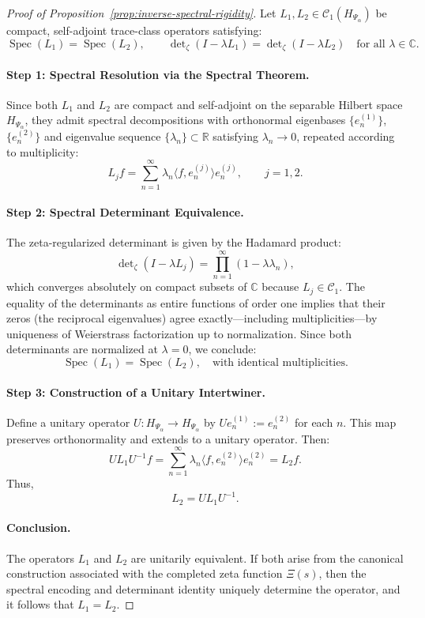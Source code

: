 \begin{proof}[Proof of Proposition~\ref{prop:inverse-spectral-rigidity}]
Let \( L_1, L_2 \in \mathcal{C}_1(H_{\Psi_\alpha}) \) be compact, self-adjoint trace-class operators satisfying:
\[
\operatorname{Spec}(L_1) = \operatorname{Spec}(L_2), \qquad
\det\nolimits_\zeta(I - \lambda L_1) = \det\nolimits_\zeta(I - \lambda L_2) \quad \text{for all } \lambda \in \mathbb{C}.
\]

\paragraph{Step 1: Spectral Resolution via the Spectral Theorem.}
Since both \( L_1 \) and \( L_2 \) are compact and self-adjoint on the separable Hilbert space \( H_{\Psi_\alpha} \), they admit spectral decompositions with orthonormal eigenbases \( \{e_n^{(1)}\} \), \( \{e_n^{(2)}\} \) and eigenvalue sequence \( \{\lambda_n\} \subset \mathbb{R} \) satisfying \( \lambda_n \to 0 \), repeated according to multiplicity:
\[
L_j f = \sum_{n=1}^\infty \lambda_n \langle f, e_n^{(j)} \rangle e_n^{(j)}, \qquad j = 1,2.
\]

\paragraph{Step 2: Spectral Determinant Equivalence.}
The zeta-regularized determinant is given by the Hadamard product:
\[
\det\nolimits_\zeta(I - \lambda L_j) = \prod_{n=1}^\infty (1 - \lambda \lambda_n),
\]
which converges absolutely on compact subsets of \( \mathbb{C} \) because \( L_j \in \mathcal{C}_1 \). The equality of the determinants as entire functions of order one implies that their zeros (the reciprocal eigenvalues) agree exactly—including multiplicities—by uniqueness of Weierstrass factorization up to normalization. Since both determinants are normalized at \( \lambda = 0 \), we conclude:
\[
\operatorname{Spec}(L_1) = \operatorname{Spec}(L_2), \quad \text{with identical multiplicities}.
\]

\paragraph{Step 3: Construction of a Unitary Intertwiner.}
Define a unitary operator \( U : H_{\Psi_\alpha} \to H_{\Psi_\alpha} \) by \( U e_n^{(1)} := e_n^{(2)} \) for each \( n \). This map preserves orthonormality and extends to a unitary operator. Then:
\[
U L_1 U^{-1} f = \sum_{n=1}^\infty \lambda_n \langle f, e_n^{(2)} \rangle e_n^{(2)} = L_2 f.
\]
Thus,
\[
L_2 = U L_1 U^{-1}.
\]

\paragraph{Conclusion.}
The operators \( L_1 \) and \( L_2 \) are unitarily equivalent. If both arise from the canonical construction associated with the completed zeta function \( \Xi(s) \), then the spectral encoding and determinant identity uniquely determine the operator, and it follows that \( L_1 = L_2 \).
\end{proof}
